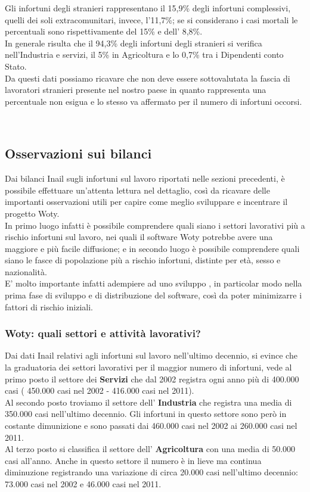 Gli infortuni degli stranieri rappresentano il 15,9\% degli infortuni complessivi, quelli dei
soli extracomunitari, invece, l’11,7\%; se si considerano i casi mortali le percentuali sono
rispettivamente del 15\% e dell’ 8,8\%.\\
In generale risulta che il 94,3\% degli infortuni degli stranieri si verifica nell’Industria e
servizi, il 5\% in Agricoltura e lo 0,7\% tra i Dipendenti conto Stato.\\
Da questi dati possiamo ricavare che non deve essere sottovalutata la fascia di lavoratori stranieri presente nel nostro paese in quanto rappresenta una percentuale non esigua e lo stesso va affermato per il numero di infortuni occorsi.



\ \ \
\subsection{Osservazioni sui bilanci}
Dai bilanci Inail sugli infortuni sul lavoro riportati nelle sezioni precedenti, è possibile effettuare un'attenta lettura nel dettaglio, così da ricavare delle importanti osservazioni utili per capire come meglio sviluppare e incentrare il progetto Woty.\\
In primo luogo infatti è possibile comprendere quali siano i settori lavorativi più a rischio infortuni sul lavoro, nei quali il software Woty potrebbe avere una maggiore e più facile diffusione; e in secondo luogo è possibile comprendere quali siano le fasce di popolazione più a rischio infortuni, distinte per età, sesso e nazionalità.\\
E' molto importante infatti adempiere ad uno sviluppo \virgolette{mirato}, in particolar modo nella prima fase di sviluppo e di distribuzione del software, così da poter minimizarre i fattori di rischio iniziali.\\


\subsubsection{Woty: quali settori e attività lavorativi?}
Dai dati Inail relativi agli infortuni sul lavoro nell'ultimo decennio, si evince che la graduatoria dei settori lavorativi per il maggior numero di infortuni, vede al primo posto il settore dei \textbf{Servizi} che dal 2002 registra ogni anno più di 400.000 casi ( 450.000 casi nel 2002 - 416.000 casi nel 2011).\\
Al secondo posto troviamo il settore dell' \textbf{Industria} che registra una media di 350.000 casi nell'ultimo decennio. Gli infortuni in questo settore sono però in costante dimunizione e sono passati dai 460.000 casi nel 2002 ai 260.000 casi nel 2011.\\
Al terzo posto si classifica il settore dell' \textbf{Agricoltura} con una media di 50.000 casi all'anno. Anche in questo settore il numero è in lieve ma continua diminuzione registrando una variazione di circa 20.000 casi nell'ultimo decennio: 73.000 casi nel 2002 e 46.000 casi nel 2011.\\

